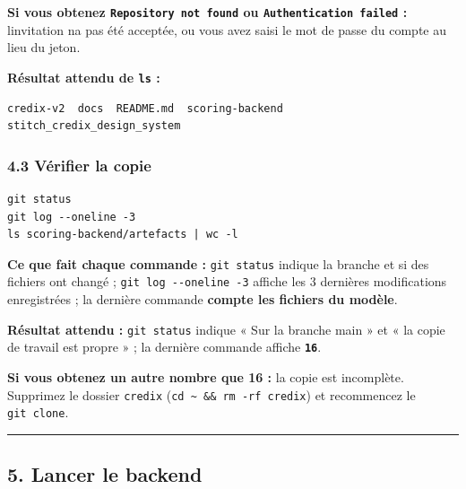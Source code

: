 \documentclass[
  french,
  11pt,
  a4paper,
]{article}
\begin{document}
\textbf{Si vous obtenez \texttt{Repository\ not\ found} ou
\texttt{Authentication\ failed} :} l\textquotesingle invitation
n\textquotesingle a pas été acceptée, ou vous avez saisi le mot de passe
du compte au lieu du jeton.

\textbf{Résultat attendu de \texttt{ls} :}

\begin{Verbatim}[breaklines=true,breakanywhere=true,fontsize=\small,frame=leftline,framerule=1.6pt,rulecolor=\color{credixblue},framesep=3mm,xleftmargin=2mm,xrightmargin=1mm]
credix-v2  docs  README.md  scoring-backend  stitch_credix_design_system
\end{Verbatim}

\subsubsection{4.3 Vérifier la copie}\label{43-vuxe9rifier-la-copie}

\begin{Verbatim}[breaklines=true,breakanywhere=true,fontsize=\small,frame=leftline,framerule=1.6pt,rulecolor=\color{credixblue},framesep=3mm,xleftmargin=2mm,xrightmargin=1mm]
git status
git log --oneline -3
ls scoring-backend/artefacts | wc -l
\end{Verbatim}

\textbf{Ce que fait chaque commande :} \texttt{git\ status} indique la
branche et si des fichiers ont changé ;
\texttt{git\ log\ -\allowbreak{}-\allowbreak{}oneline\ -\allowbreak{}3}
affiche les 3 dernières modifications enregistrées ; la dernière
commande \textbf{compte les fichiers du modèle}.

\textbf{Résultat attendu :} \texttt{git\ status} indique « Sur la
branche main » et « la copie de travail est propre » ; la dernière
commande affiche \textbf{\texttt{16}}.

\textbf{Si vous obtenez un autre nombre que 16 :} la copie est
incomplète. Supprimez le dossier \texttt{credix}
(\texttt{cd\ \textasciitilde{}\ \&\&\ rm\ -rf\ credix}) et recommencez
le \texttt{git\ clone}.

\begin{center}\rule{0.5\linewidth}{0.5pt}\end{center}

\subsection{5. Lancer le backend}\label{5-lancer-le-backend}
\end{document}
